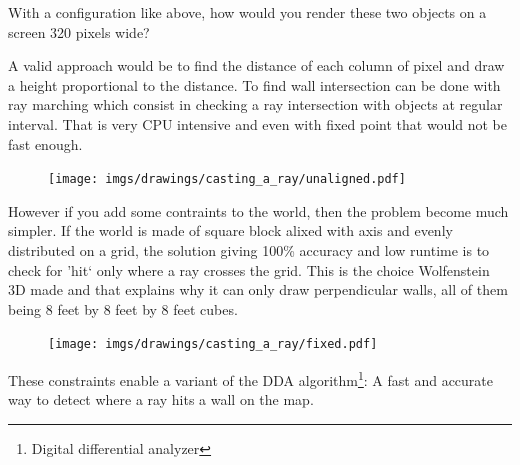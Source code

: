 With a configuration like above, how would you render these two objects on a screen 320 pixels wide?\\
\par
A valid approach would be to find the distance of each column of pixel and draw a height proportional to the distance. To find wall intersection can be done with ray marching which consist in checking a ray intersection with objects at regular interval. That is very CPU intensive and even with fixed point that would not be fast enough.
\begin{figure}[H]
\centering
\texttt{[image: imgs/drawings/casting\_a\_ray/unaligned.pdf]}
\end{figure}


However if you add some contraints to the world, then the problem become much simpler. If the world is made of square block alixed with axis and evenly distributed on a grid, the solution giving 100\% accuracy and low runtime is to check for 'hit` only where a ray crosses the grid. This is the choice Wolfenstein 3D made and that explains why it can only draw perpendicular walls, all of them being 8 feet by 8 feet by 8 feet cubes.
\begin{figure}[H]
\centering
\texttt{[image: imgs/drawings/casting\_a\_ray/fixed.pdf]}
 
\end{figure}
\par
These constraints enable a variant of the DDA algorithm\footnote{Digital differential analyzer}: A fast and accurate way to detect where a ray hits a wall on the map.
\par
